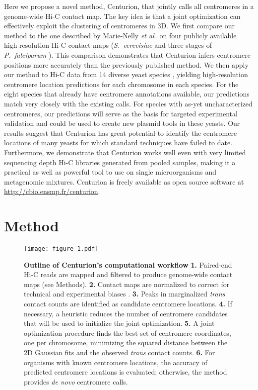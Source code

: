Here we propose a novel method, Centurion, that jointly
calls all centromeres in a genome-wide Hi-C contact map. The key idea is that
a joint optimization can effectively exploit the clustering of centromeres in
3D. We first compare our method to the one described by
Marie-Nelly \textit{et al}.\ on four publicly
available high-resolution Hi-C
contact maps (\textit{S.\ cerevisiae} \citep{duan:genome-wide} and three stages
of \textit{P.\ falciparum} \citep{ay:three-dimensional}). This comparison
demonstrates that Centurion infers centromere positions more accurately than
the previously published method. We then apply our method to Hi-C data from 14
diverse yeast species \citep{burton:species-level}, yielding high-resolution
centromere location predictions for each chromosome in each species. For the
eight species that already have centromere annotations available, our
predictions match very closely with the existing calls. For species with
as-yet uncharacterized centromeres, our predictions will serve as the basis
for targeted experimental validation and could be used to create new plasmid
tools in these yeasts. Our results suggest that Centurion has great potential
to identify the centromere locations of many yeasts for which standard
techniques have failed to date. Furthermore, we demonstrate that Centurion
works well even with very limited sequencing depth Hi-C libraries generated
from pooled samples, making it a practical as well as powerful tool to use on
single microorganisms and metagenomic mixtures. Centurion is freely available
as open source software at
\href{http://cbio.ensmp.fr/centurion}{http://cbio.ensmp.fr/centurion}.

\section{Method}

\begin{figure*}
\texttt{[image: figure\_1.pdf]}
\caption{\textbf{Outline of Centurion's computational workflow}
\textbf{1.} Paired-end Hi-C reads are mapped and filtered to produce
genome-wide contact maps (see Methods). 
\textbf{2.} Contact maps are normalized to correct for technical and
experimental biases \citep{imakaev:iterative}.
\textbf{3.} Peaks in marginalized \textit{trans} contact counts are identified
as candidate centromere locations.
\textbf{4.} If necessary, a heuristic reduces the number of centromere
candidates that will be used to initialize the joint optimization. 
\textbf{5.} A joint optimization procedure finds the best set of centromere
coordinates, one per chromosome, minimizing the squared distance between the
2D Gaussian fits and the observed \textit{trans} contact counts. 
\textbf{6.} For organisms with known centromere locations, the accuracy of
predicted centromere locations is evaluated; otherwise, the method provides \textit{de
novo} centromere calls. 
}
\label{fig:methods}
\end{figure*}



